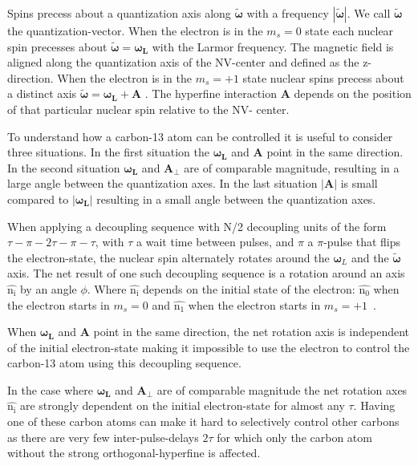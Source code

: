 Spins precess about a quantization axis along $ \bm{\tilde{\omega}}$ with a frequency $|\bm{\tilde{\omega}}|$. We call $ \bm{\tilde{\omega}} $ the quantization-vector. When the electron is in the $m_s=0$ state each nuclear spin precesses about $\bm{\tilde{\omega}} = \bm{\omega_L}$ with the Larmor frequency. The magnetic field is aligned along the quantization axis of the NV-center and defined as the z-direction. When the electron is in the $m_s=+1$ state nuclear spins precess about a distinct axis $\bm{\tilde{\omega}}=\bm{\omega_L} +\bm{A}$ \citep{Taminiau2012Detection}. The hyperfine interaction $\bm{A}$ depends on the position of that particular nuclear spin relative to the NV- center.

To understand how a carbon-13 atom can be controlled it is useful to consider three situations. In the first situation the $\bm{\omega_L}$ and $\bm{A}$ point in the same direction. In the second situation $\bm{\omega_L}$ and $\bm{A_\perp}$ are of comparable magnitude, resulting in a large angle between the quantization axes. In the last situation $|\bm{A}|$ is small compared to  $\bm{|\omega_L|}$ resulting in a small angle between the quantization axes.

When applying a decoupling sequence with N\slash 2 decoupling units of the form {$\tau - \pi -2\tau-\pi-\tau$}, with $\tau$ a wait time between pulses, and $\pi$ a $\pi$-pulse that flips the electron-state, the nuclear spin alternately rotates around the  $\bm\omega_L$ and the $\bm{\tilde{\omega}}$ axis. The net result of one such decoupling sequence is a rotation around an axis $\bm{\hat{\mathrm{n_i}}}$ by an angle $\phi$. Where $\bm{\hat{\mathrm{n_i}}}$ depends on the initial state of the electron: $\bm{\hat{\mathrm{n_0}}}$ when the electron starts in $m_s = 0$ and $\bm{\hat{\mathrm{n_1}}}$ when the electron starts in $m_s = +1$~\citep{Taminiau2012Detection}.

When $\bm{\omega_L}$ and $\bm{A}$ point in the same direction, the net rotation axis is independent of the initial electron-state making it impossible to use the electron to control the carbon-13 atom using this decoupling sequence.

In the case where $\bm{\omega_L}$ and $\bm{A_\perp}$ are of comparable magnitude the net rotation axes $\bm{\hat{\mathrm{n_i}}}$ are strongly dependent on the initial electron-state for almost any $\tau$. Having one of these carbon atoms can make it hard to selectively control other carbons as there are very few inter-pulse-delays $2\tau$ for which only the carbon atom without the strong orthogonal-hyperfine is affected.

